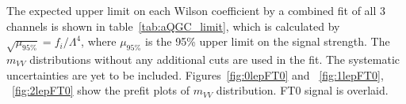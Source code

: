 The expected upper limit on each Wilson coefficient by a combined fit of all 3 channels is shown in table~\ref{tab:aQGC_limit}, which is calculated by $\sqrt{\mu_{95\%}} = f_{i} / \Lambda^4$, where $\mu_{95\%}$ is the 95\% upper limit on the signal strength.
The $m_{VV}$ distributions without any additional cuts are used in the fit.
The systematic uncertainties are yet to be included.
Figures~\ref{fig:0lepFT0} and ~\ref{fig:1lepFT0}, ~\ref{fig:2lepFT0} show the prefit plots of $m_{VV}$ distribution. FT0 signal is overlaid.

\begin{table}[ht!]
\small
\begin{center}
\caption{Expected upper limits of each Wilson coefficient. All 3 channels are combined.}
\label{tab:aQGC_limit}
\end{center}
\end{table}

